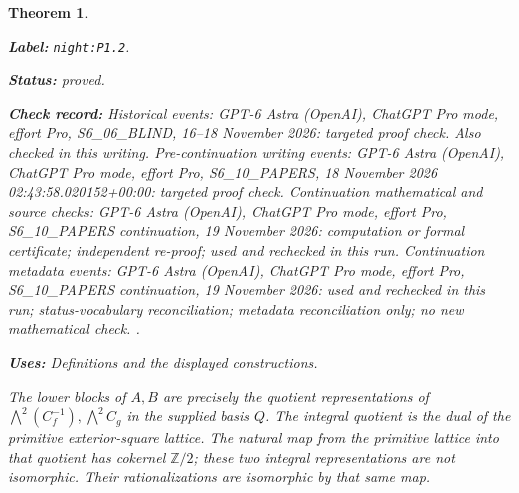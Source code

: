 \documentclass[11pt,a4paper]{article}
\newtheorem{theorem}{Theorem}[section]
\theoremstyle{definition}
\newcommand{\StatementRecord}[4]{\par\smallskip\begingroup\upshape\raggedright\noindent\textbf{Label:} \nolinkurl{#1}.\par\noindent\textbf{Status:} #2.\par\noindent\textbf{Check record:} #3.\par\noindent\textbf{Uses:} #4.\par\endgroup\smallskip}
\begin{document}
\begin{theorem}\label{night:P1.2}
\StatementRecord{night:P1.2}{proved}{Historical events: GPT-6 Astra (OpenAI), ChatGPT Pro mode, effort Pro, S6\_06\_BLIND, 16--18 November 2026: targeted proof check. Also checked in this writing. Pre-continuation writing events: GPT-6 Astra (OpenAI), ChatGPT Pro mode, effort Pro, S6\_10\_PAPERS, 18 November 2026 02:43:58.020152+00:00: targeted proof check. Continuation mathematical and source checks: GPT-6 Astra (OpenAI), ChatGPT Pro mode, effort Pro, S6\_10\_PAPERS continuation, 19 November 2026: computation or formal certificate; independent re-proof; used and rechecked in this run. Continuation metadata events: GPT-6 Astra (OpenAI), ChatGPT Pro mode, effort Pro, S6\_10\_PAPERS continuation, 19 November 2026: used and rechecked in this run; status-vocabulary reconciliation; metadata reconciliation only; no new mathematical check. }{Definitions and the displayed constructions}
The lower blocks of $A,B$ are precisely the quotient representations of
$\bigwedge^2(C_f^{-1}),\bigwedge^2C_g$ in the supplied basis $Q$.
The integral quotient is the dual of the primitive exterior-square
lattice.  The natural map from the primitive lattice into that quotient
has cokernel $\mathbb Z/2$; these two integral representations are not
isomorphic.  Their rationalizations are isomorphic by that same map.
\end{theorem}
\end{document}
